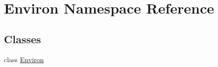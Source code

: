 \hypertarget{namespaceEnviron}{\section{Environ Namespace Reference}
\label{namespaceEnviron}
}
\subsection*{Classes}
\begin{DoxyCompactItemize}
\item 
class \hyperlink{classEnviron_1_1Environ}{Environ}
\end{DoxyCompactItemize}
